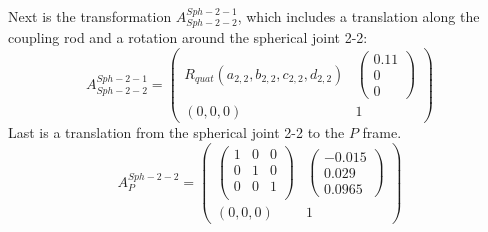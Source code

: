 \documentclass[12pt,a4paper]{article}
\begin{document}
Next is the transformation $A_{Sph-2-2}^{Sph-2-1}$, which includes a translation along the coupling rod and a rotation around the spherical joint 2-2:
\begin{equation}
    A_{Sph-2-2}^{Sph-2-1}
    =
    \begin{pmatrix}
        R_{quat}(a_{2,2},b_{2,2},c_{2,2},d_{2,2}) & \begin{pmatrix} 0.11 \\0 \\0 \end{pmatrix}\\
        (0, 0, 0)& 1
        \end{pmatrix}
\end{equation}
Last is a translation from the spherical joint 2-2 to the $P$ frame.
\begin{equation}
    A_{P}^{Sph-2-2}
    =
    \begin{pmatrix}
        \begin{pmatrix}
        1&0&0\\
        0&1&0 \\
        0&0&1\\
        \end{pmatrix} 
        & 
        \begin{pmatrix} -0.015 \\0.029 \\0.0965 \end{pmatrix}\\
        (0, 0, 0)& 1
        \end{pmatrix}
\end{equation}
\end{document}
